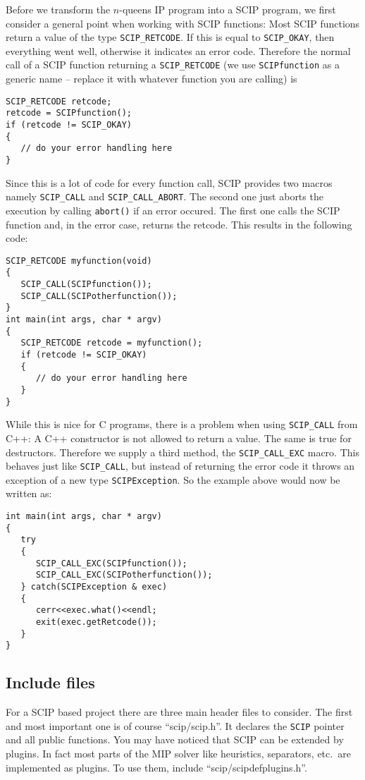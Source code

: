 \documentclass[a4paper]{article}
\begin{document}
Before we transform the $n$-queens IP program into a SCIP program, we first consider a general point when working with
SCIP functions: Most SCIP functions return a value of the type \verb+SCIP_RETCODE+. If this is equal to
\verb+SCIP_OKAY+, then everything went well, otherwise it indicates an error code. Therefore the normal call of a
SCIP function returning a \verb+SCIP_RETCODE+ (we use \verb+SCIPfunction+ as a generic name -- replace it with
whatever function you are calling) is
\begin{verbatim}
SCIP_RETCODE retcode;
retcode = SCIPfunction();
if (retcode != SCIP_OKAY)
{
   // do your error handling here
}
\end{verbatim}
Since this is a lot of code for every function call, SCIP provides two macros namely \verb+SCIP_CALL+ and
\verb+SCIP_CALL_ABORT+. The second one just aborts the execution by calling \verb+abort()+ if an error occured.
The first one calls the SCIP function and, in the error case, returns the retcode. This results in the following code:
\begin{verbatim}
SCIP_RETCODE myfunction(void)
{
   SCIP_CALL(SCIPfunction());
   SCIP_CALL(SCIPotherfunction());
}
int main(int args, char * argv)
{
   SCIP_RETCODE retcode = myfunction();
   if (retcode != SCIP_OKAY)
   {
      // do your error handling here
   }
}
\end{verbatim}
While this is nice for C programs, there is a problem when using \verb+SCIP_CALL+ from C++: A C++ constructor is not
allowed to return a value. The same is true for destructors. Therefore we supply a third method, the
\verb+SCIP_CALL_EXC+ macro. This behaves just like \verb+SCIP_CALL+, but instead of returning the error code it
throws an exception of a new type \verb+SCIPException+. So the example above would now be written as:
\begin{verbatim}
int main(int args, char * argv)
{
   try
   {
      SCIP_CALL_EXC(SCIPfunction());
      SCIP_CALL_EXC(SCIPotherfunction());
   } catch(SCIPException & exec)
   {
      cerr<<exec.what()<<endl;
      exit(exec.getRetcode());
   }
}
\end{verbatim}

\subsection{Include files}

For a SCIP based project there are three main header files to consider. The first and most important one is of course
``scip/scip.h''. It declares the \verb+SCIP+ pointer and all public functions. You may have noticed that SCIP can be
extended by plugins.
In fact most parts of the MIP solver like heuristics, separators, etc.\ are implemented as plugins. To use them, include
``scip/scipdefplugins.h''.
\end{document}
